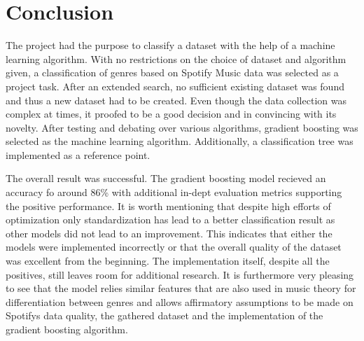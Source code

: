 \section{Conclusion}

    The project had the purpose to classify a dataset with the help of a machine learning algorithm. With no restrictions on the choice of dataset and algorithm given, 
    a classification of genres based on Spotify Music data was selected as a project task. After an extended search, 
    no sufficient existing dataset was found and thus a new dataset had to be created. Even though the data collection was complex at times, 
    it proofed to be a good decision and in convincing with its novelty. After testing and debating over various algorithms, gradient boosting was
    selected as the machine learning algorithm. Additionally, a classification tree was implemented as a reference point.


    The overall result was successful. The gradient boosting model recieved an accuracy fo around 86\% with additional in-dept evaluation metrics supporting the
    positive performance. It is worth mentioning that despite high efforts of optimization only standardization has lead to a better classification result as other models 
    did not lead to an improvement. This indicates that either the models were implemented incorrectly or that the overall quality of the dataset was excellent from the 
    beginning. The implementation itself, despite all the positives, still leaves room for additional research. It is furthermore very pleasing to see that the model relies 
    similar features that are also used in music theory for differentiation between genres and allows affirmatory assumptions to be made on Spotifys data quality, the gathered dataset 
    and the implementation of the gradient boosting algorithm. 

